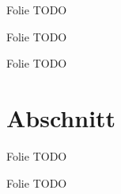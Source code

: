 \begin{frame}{Folie}
    TODO
\end{frame}

\begin{frame}{Folie}
    TODO
\end{frame}

\begin{frame}{Folie}
    TODO
\end{frame}

\section{Abschnitt}

\begin{frame}{Folie}
    TODO
\end{frame}

\begin{frame}{Folie}
    TODO
\end{frame}

